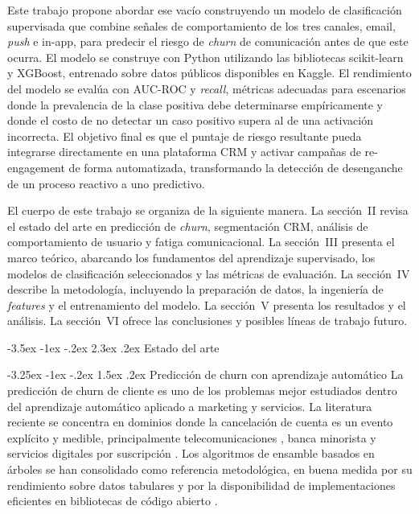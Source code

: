 \documentclass[11pt,a4paper]{article}
\makeatletter
\renewcommand\section{\@startsection{section}{1}{\z@}%
  {-3.5ex \@plus -1ex \@minus -.2ex}%
  {2.3ex \@plus.2ex}%
  {\normalfont\normalsize\centering}}
\renewcommand\subsection{\@startsection{subsection}{2}{\z@}%
  {-3.25ex \@plus -1ex \@minus -.2ex}%
  {1.5ex \@plus .2ex}%
  {\normalfont\normalsize\itshape}}
\makeatother
\begin{document}
Este trabajo propone abordar ese vacío construyendo un modelo de
clasificación supervisada que combine señales de comportamiento de los
tres canales, email, \textit{push} e in-app, para predecir el riesgo de
\textit{churn} de comunicación antes de que este ocurra. El modelo se
construye con Python utilizando las bibliotecas scikit-learn y XGBoost,
entrenado sobre datos públicos disponibles en Kaggle. El rendimiento
del modelo se evalúa con AUC-ROC y \textit{recall}, métricas adecuadas
para escenarios donde la prevalencia de la clase positiva debe
determinarse empíricamente y donde el costo de no detectar un caso
positivo supera al de una activación incorrecta. El
objetivo final es que el puntaje de riesgo resultante pueda integrarse
directamente en una plataforma CRM y activar campañas de re-engagement
de forma automatizada, transformando la detección de desenganche de un
proceso reactivo a uno predictivo.

El cuerpo de este trabajo se organiza de la siguiente manera. La sección~II revisa el estado del arte en predicción de \textit{churn}, segmentación CRM, análisis de comportamiento de usuario y fatiga comunicacional. La sección~III presenta el marco teórico, abarcando los fundamentos del aprendizaje supervisado, los modelos de clasificación seleccionados y las métricas de evaluación. La sección~IV describe la metodología, incluyendo la preparación de datos, la ingeniería de \textit{features} y el entrenamiento del modelo. La sección~V presenta los resultados y el análisis. La sección~VI ofrece las conclusiones y posibles líneas de trabajo futuro.

\section{Estado del arte}
 
\subsection{Predicción de churn con aprendizaje automático}
La predicción de churn de cliente es uno de los problemas mejor estudiados dentro del aprendizaje automático aplicado a marketing y servicios. La literatura reciente se concentra en dominios donde la cancelación de cuenta es un evento explícito y medible, principalmente telecomunicaciones \cite{abdelhady2025leveraging, barsotti2024decade}, banca minorista \cite{brito2024framework} y servicios digitales por suscripción \cite{lalwani2022customer}. Los algoritmos de ensamble basados en árboles se han consolidado como referencia metodológica, en buena medida por su rendimiento sobre datos tabulares y por la disponibilidad de implementaciones eficientes en bibliotecas de código abierto \cite{brito2024framework, lalwani2022customer}.
 
\end{document}
